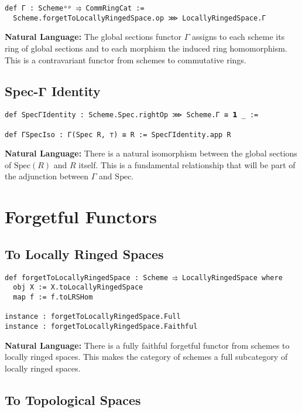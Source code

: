 \documentclass{article}
\theoremstyle{definition}
\begin{document}
\begin{lstlisting}
def Γ : Schemeᵒᵖ ⥤ CommRingCat :=
  Scheme.forgetToLocallyRingedSpace.op ⋙ LocallyRingedSpace.Γ
\end{lstlisting}

\textbf{Natural Language:} The global sections functor $\Gamma$ assigns to each scheme its ring of global sections and to each morphism the induced ring homomorphism. This is a contravariant functor from schemes to commutative rings.

\subsection{Spec-Γ Identity}

\begin{lstlisting}
def SpecΓIdentity : Scheme.Spec.rightOp ⋙ Scheme.Γ ≅ 𝟭 _ :=

def ΓSpecIso : Γ(Spec R, ⊤) ≅ R := SpecΓIdentity.app R
\end{lstlisting}

\textbf{Natural Language:} There is a natural isomorphism between the global sections of $\mathrm{Spec}(R)$ and $R$ itself. This is a fundamental relationship that will be part of the adjunction between $\Gamma$ and $\mathrm{Spec}$.

\section{Forgetful Functors}

\subsection{To Locally Ringed Spaces}

\begin{lstlisting}
def forgetToLocallyRingedSpace : Scheme ⥤ LocallyRingedSpace where
  obj X := X.toLocallyRingedSpace
  map f := f.toLRSHom

instance : forgetToLocallyRingedSpace.Full
instance : forgetToLocallyRingedSpace.Faithful
\end{lstlisting}

\textbf{Natural Language:} There is a fully faithful forgetful functor from schemes to locally ringed spaces. This makes the category of schemes a full subcategory of locally ringed spaces.

\subsection{To Topological Spaces}
\end{document}
